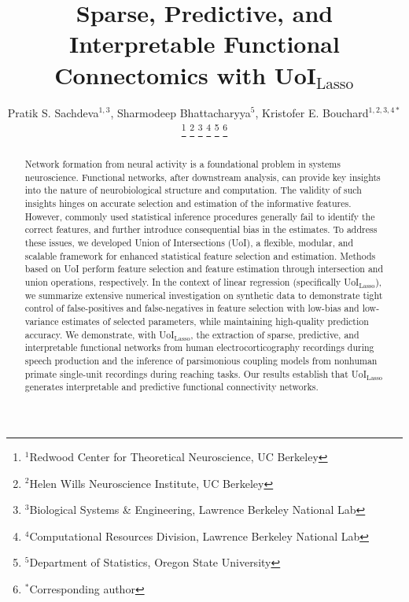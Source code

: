 \documentclass[letterpaper, 10 pt, conference]{ieeeconf}  %
\title{\LARGE \bf
Sparse, Predictive, and Interpretable Functional Connectomics with UoI$_{\text{Lasso}}$
}
\author{
    Pratik S. Sachdeva$^{1, 3}$, Sharmodeep Bhattacharyya$^{5}$, Kristofer E. Bouchard$^{1,2,3,4*}$%
    \thanks{
        $^{1}$Redwood Center for Theoretical Neuroscience, UC Berkeley
    }%
    \thanks{
        $^{2}$Helen Wills Neuroscience Institute, UC Berkeley
    }
    \thanks{
        $^{3}$Biological Systems \& Engineering, Lawrence Berkeley National Lab
    }
    \thanks{
        $^{4}$Computational Resources Division, Lawrence Berkeley National Lab
    }%
    \thanks{
        $^{5}$Department of Statistics, Oregon State University
    }
    \thanks{
        $^*$Corresponding author
    }%
}
\begin{document}
\maketitle
\thispagestyle{empty}
\pagestyle{empty}


\begin{abstract}

Network formation from neural activity is a foundational problem in systems neuroscience. Functional networks, after downstream analysis, can provide key insights into the nature of neurobiological structure and computation. The validity of such insights hinges on accurate selection and estimation of the informative features.  However, commonly used statistical inference procedures generally fail to identify the correct features, and further introduce consequential bias in the estimates. To address these issues, we developed Union of Intersections (UoI), a flexible, modular, and scalable framework for enhanced statistical feature selection and estimation. Methods based on UoI perform feature selection and feature estimation through intersection and union operations, respectively. In the context of linear regression (specifically UoI$_{\text{Lasso}}$), we summarize extensive numerical investigation on synthetic data to demonstrate tight control of false-positives and false-negatives in feature selection with low-bias and low-variance estimates of selected parameters, while maintaining high-quality prediction accuracy. We demonstrate, with UoI$_{\text{Lasso}}$, the extraction of sparse, predictive, and interpretable functional networks from human electrocorticography recordings during speech production and  the inference of parsimonious coupling models from nonhuman primate single-unit recordings during reaching tasks. Our results establish that UoI$_{\text{Lasso}}$ generates interpretable and predictive functional connectivity networks.

\end{abstract}


\end{document}
